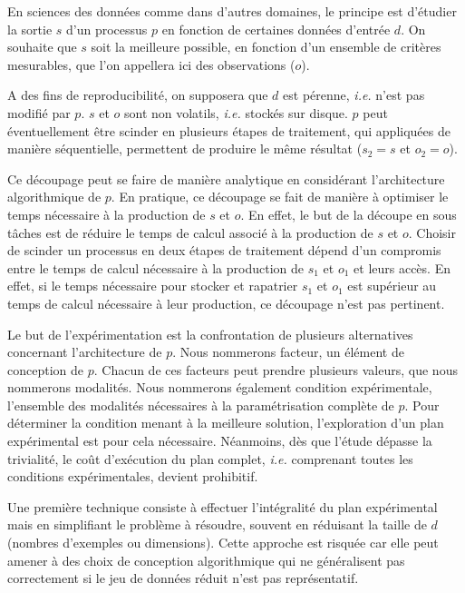 
En sciences des données comme dans d'autres domaines, le principe est d'étudier la sortie $s$ d'un processus $p$ en fonction de certaines données d'entrée $d$. On souhaite que $s$ soit la meilleure possible, en fonction d'un ensemble de critères mesurables, que l'on appellera ici des \textsf
{observations} ($o$).


A des fins de reproducibilité, on supposera que $d$ est pérenne, \textit{i.e.} n'est pas modifié par $p$. $s$ et $o$ sont non volatils, \textit{i.e.} stockés sur disque. $p$ peut éventuellement être scinder en plusieurs étapes de traitement, qui appliquées de manière séquentielle, permettent de produire le même résultat ($s_2=s$ et $o_2=o$). 

Ce découpage peut se faire de manière analytique en considérant l'architecture algorithmique de $p$. En pratique, ce découpage se fait de manière à optimiser le temps nécessaire à la production de $s$ et $o$. En effet, le but de la découpe en sous tâches est de réduire le temps de calcul associé à la production de $s$ et $o$. Choisir de scinder un processus en deux étapes de traitement dépend d'un compromis entre le temps de calcul nécessaire à la production de $s_1$ et $o_1$ et leurs accès. En effet, si le temps nécessaire pour stocker et rapatrier $s_1$ et $o_1$ est supérieur au temps de calcul nécessaire à leur production, ce découpage n'est pas pertinent.

Le but de l'expérimentation est la confrontation de plusieurs alternatives concernant l'architecture de $p$. Nous nommerons \textsf{facteur}, un élément de conception de $p$. Chacun de ces facteurs peut prendre plusieurs valeurs, que nous nommerons \textsf{modalités}. Nous nommerons également \textsf
{condition expérimentale}, l'ensemble des modalités nécessaires à la  paramétrisation complète de $p$. Pour déterminer la condition menant à la meilleure solution, l'exploration d'un plan expérimental est pour cela nécessaire. Néanmoins, dès que l'étude dépasse la trivialité, le coût d'exécution du plan complet, \textit{i.e.} comprenant toutes les conditions expérimentales, devient prohibitif.

Une première technique consiste à effectuer l'intégralité du plan expérimental mais en simplifiant le problème à résoudre, souvent en réduisant la taille de $d$ (nombres d'exemples ou dimensions). Cette approche est risquée car elle peut amener à des choix de conception algorithmique qui ne généralisent pas correctement si le jeu de données réduit n'est pas représentatif.

